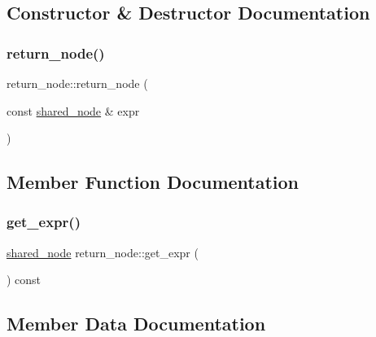 \subsection{Constructor \& Destructor Documentation}
\mbox{\label{classjawe_1_1return__node_a6473fb959a75fefd14730a50528b10da}} 
\subsubsection{\texorpdfstring{return\+\_\+node()}{return\_node()}}
{\footnotesize\ttfamily return\+\_\+node\+::return\+\_\+node (\begin{DoxyParamCaption}\item[{const \hyperlink{namespacejawe_a3f307481d921b6cbb50cc8511fc2b544}{shared\+\_\+node} \&}]{expr }\end{DoxyParamCaption})}



\subsection{Member Function Documentation}
\mbox{\label{classjawe_1_1return__node_ab361c0433176d9deb9efefabb1b1c764}} 
\subsubsection{\texorpdfstring{get\+\_\+expr()}{get\_expr()}}
{\footnotesize\ttfamily \hyperlink{namespacejawe_a3f307481d921b6cbb50cc8511fc2b544}{shared\+\_\+node} return\+\_\+node\+::get\+\_\+expr (\begin{DoxyParamCaption}{ }\end{DoxyParamCaption}) const}



\subsection{Member Data Documentation}
\mbox{\label{classjawe_1_1return__node_ab2803a023567775a34848949faf323b1}} 
